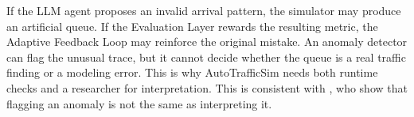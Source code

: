 \begin{bibunit}[plainnat]


If the LLM agent proposes an invalid arrival pattern, the simulator may produce
an artificial queue. If the Evaluation Layer rewards the resulting metric, the
Adaptive Feedback Loop may reinforce the original mistake. An anomaly detector
can flag the unusual trace, but it cannot decide whether the queue is a real
traffic finding or a modeling error. This is why AutoTrafficSim needs both
runtime checks and a researcher for interpretation. This is consistent with
\citet{kwon2026aivv}, who show that flagging an anomaly is not the same as
interpreting it.


\end{bibunit}
